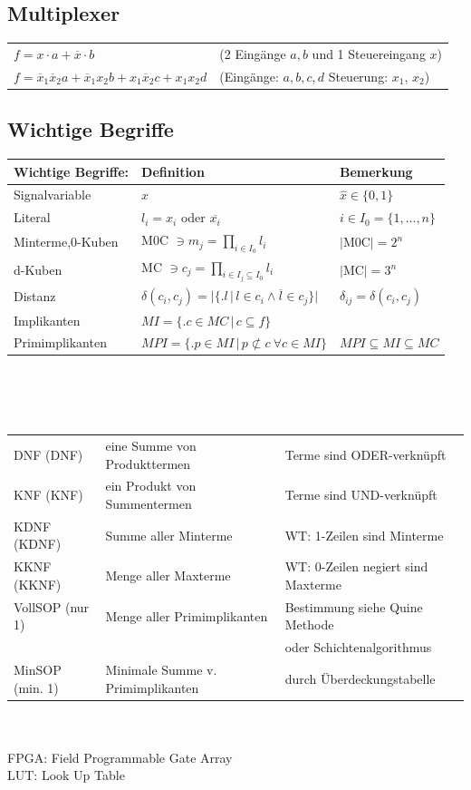 \documentclass[6pt,a4paper]{scrartcl}
\newcommand{\iset}[2]{\ensuremath{\bigl\{ \bigl. #1 \, \bigr| \, #2 \bigr\}}}		%
\newcommand{\eset}[1]{\ensuremath{\bigl\{#1\bigr\}}}								%
\newcommand{\ol}[1]{\ensuremath{\overline{#1}}}									%
\begin{document}
\begin{multicols*}{3}
	\subsection{Multiplexer}
	\begin{tabular}{ll}
		$f = x \cdot a + \overline x \cdot b$ & (2 Eingänge $a,b$ und 1 Steuereingang $x$)\\
		$f = \ol x_1 \ol x_2 a + \ol x_1 x_2 b + x_1  \ol x_2 c + x_1 x_2d$ & (Eingänge: $a,b,c,d$  Steuerung: $x_1$, $x_2$)\\
	\end{tabular}



	\subsection{Wichtige Begriffe}
	\begin{tabular}{l|l|l}
		Wichtige Begriffe: & Definition & Bemerkung\\ \hline
		Signalvariable & $x$ & $\hat x \in \eset{0,1}$ \\
		Literal & $l_i = x_i$ oder $\overline{x_i}$ & $i \in I_0=\eset{1,...,n}$\\
		Minterme,0-Kuben & M0C $\ni m_j = \prod\limits_{i\in I_0} l_i$ & $|$M0C$| = 2^n$ \\
		d-Kuben & MC $\ni c_j = \prod\limits_{i\in I_j \subseteq I_0} l_i$ & $|$MC$|=3^n$\\
		Distanz & $\delta(c_i,c_j) = \bigl| \iset{l}{l \in c_i \land \overline{l}\in c_j}  \bigr|$ & $\delta_{ij} = \delta(c_i,c_j)$ \\
		Implikanten & $MI = \iset{c \in MC}{c \subseteq f}$ &  \\
		Primimplikanten & $MPI = \iset{p \in MI}{p \not\subset c \ \forall c \in MI}$ & $MPI \subseteq MI \subseteq MC$\\
	\end{tabular}\\ \\ \\
	\begin{tabular}{l|l|l}
		DNF (DNF) & eine Summe von Produkttermen & Terme sind ODER-verknüpft \\
		KNF (KNF) & ein Produkt von Summentermen & Terme sind UND-verknüpft\\
		KDNF (KDNF)& Summe aller Minterme & WT: 1-Zeilen sind Minterme\\
		KKNF (KKNF)& Menge aller Maxterme & WT: 0-Zeilen negiert sind Maxterme \\
		VollSOP (nur 1)& Menge aller Primimplikanten & Bestimmung siehe Quine Methode\\
		& & oder Schichtenalgorithmus\\
		MinSOP (min. 1)& Minimale Summe v. Primimplikanten & durch Überdeckungstabelle \\
	\end{tabular}
	\\ \\
	FPGA: Field Programmable Gate Array\\
	LUT: Look Up Table\\





\end{multicols*}
\end{document}
